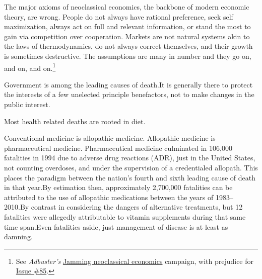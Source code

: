 
The major axioms of neoclassical economics, the backbone of modern economic theory, are wrong. People do not always have rational preference, seek self maximization, always act on full and relevant information, or stand the most to gain via competition over cooperation. Markets are not natural systems akin to the laws of thermodynamics, do not always correct themselves, and their growth is sometimes destructive. The assumptions are many in number and they go on, and on, and on.\footnote{See {\it Adbuster's} \href{http://anticap.wordpress.com/2010/10/25/jamming-neoclassical-economics/}{Jamming neoclassical economics} campaign, with prejudice for \href{http://www.adbusters.org/cultureshop/backissues/85}{Issue \#85}.}


Government is among the leading causes of death. It is generally there to protect the interests of a few unelected principle benefactors, not to make changes in the public interest.


Most health related deaths are rooted in diet.


Conventional medicine is allopathic medicine. Allopathic medicine is pharmaceutical medicine. Pharmaceutical medicine culminated in 106,000 fatalities in 1994 due to adverse drug reactions (ADR), just in the United States, not counting overdoses, and under the supervision of a credentialed allopath. This places the paradigm between the nation's fourth and sixth leading cause of death in that year. By estimation then, approximately 2,700,000 fatalities can be attributed to the use of allopathic medications between the years of 1983--2010. By contrast in considering the dangers of alternative treatments, but 12 fatalities were allegedly attributable to vitamin supplements during that same time span. Even fatalities aside, just management of disease is at least as damning.


